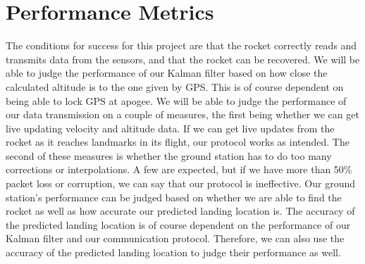 \documentclass[onecolumn, draftclsnofoot,10pt, compsoc]{IEEEtran}
\begin{document}
\section{Performance Metrics}
The conditions for success for this project are that the rocket correctly reads and transmits data from the sensors, and that the rocket can be recovered.
We will be able to judge the performance of our Kalman filter based on how close the calculated altitude is to the one given by GPS.
This is of course dependent on being able to lock GPS at apogee.
We will be able to judge the performance of our data transmission on a couple of measures, the first being whether we can get live updating velocity and altitude data.
If we can get live updates from the rocket as it reaches landmarks in its flight, our protocol works as intended.
The second of these measures is whether the ground station has to do too many corrections or interpolations.
A few are expected, but if we have more than 50\% packet loss or corruption, we can say that our protocol is ineffective.
Our ground station's performance can be judged based on whether we are able to find the rocket as well as how accurate our predicted landing location is.
The accuracy of the predicted landing location is of course dependent on the performance of our Kalman filter and our communication protocol.
Therefore, we can also use the accuracy of the predicted landing location to judge their performance as well.
\end{document}
